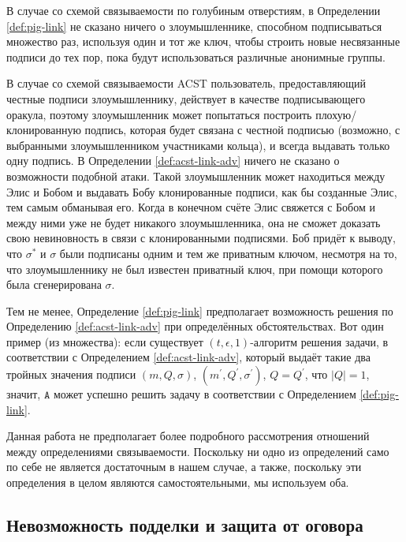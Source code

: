 \documentclass{llncs}
\newcommand{\A}{\texttt{A}}
\begin{document}
В случае со схемой связываемости по голубиным отверстиям, в Определении \ref{def:pig-link} не сказано ничего о злоумышленнике, способном подписываться множество раз, используя один и тот же ключ, чтобы строить новые несвязанные подписи до тех пор, пока будут использоваться различные анонимные группы.

В случае со схемой связываемости ACST пользователь, предоставляющий честные подписи злоумышленнику, действует в качестве подписывающего оракула, поэтому злоумышленник может попытаться построить плохую/клонированную подпись, которая будет связана с честной подписью (возможно, с выбранными злоумышленником участниками кольца), и всегда выдавать только одну подпись. В Определении \ref{def:acst-link-adv} ничего не сказано о возможности подобной атаки. Такой злоумышленник может находиться между Элис и Бобом и выдавать Бобу клонированные подписи, как бы созданные Элис, тем самым обманывая его. Когда в конечном счёте Элис свяжется с Бобом и между ними уже не будет никакого злоумышленника, она не сможет доказать свою невиновность в связи с клонированными подписями. Боб придёт к выводу, что $\sigma^*$ и $\sigma$ были подписаны одним и тем же приватным ключом, несмотря на то, что злоумышленнику не был известен приватный ключ, при помощи которого была сгенерирована $\sigma$.

Тем не менее, Определение \ref{def:pig-link} предполагает возможность решения по Определению \ref{def:acst-link-adv} при определённых обстоятельствах. Вот один пример (из множества): если существует $(t, \epsilon, 1)$-алгоритм решения задачи, в соответствии с Определением \ref{def:acst-link-adv}, который выдаёт такие два тройных значения подписи $(m, Q, \sigma)$, $(m^\prime, Q^\prime, \sigma^\prime)$, $Q = Q^\prime$, что $\left|Q\right| = 1$, значит, $\A$ может успешно решить задачу в соответствии с Определением \ref{def:pig-link}.

Данная работа не предполагает более подробного рассмотрения отношений между определениями связываемости. Поскольку ни одно из определений само по себе не является достаточным в нашем случае, а также, поскольку эти определения в целом являются самостоятельными, мы используем оба.


\subsection{Невозможность подделки и защита от оговора}
\end{document}
